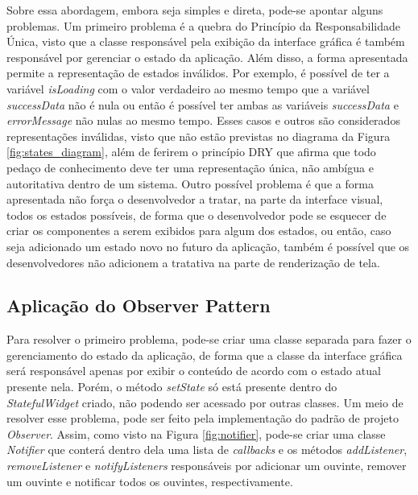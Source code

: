\documentclass[12pt, %
openright, 
oneside, %
a4paper,    %
brazil]{facom-ufu-abntex2}
\begin{document}
Sobre essa abordagem, embora seja simples e direta, pode-se apontar alguns problemas. Um primeiro problema é a quebra do Princípio da Responsabilidade Única, visto que a classe responsável pela exibição da interface gráfica é também responsável por gerenciar o estado da aplicação. Além disso, a forma apresentada permite a representação de estados inválidos. Por exemplo, é possível de ter a variável \textit{isLoading} com o valor verdadeiro ao mesmo tempo que a variável \textit{successData} não é nula ou então é possível ter ambas as variáveis \textit{successData} e \textit{errorMessage} não nulas ao mesmo tempo. Esses casos e outros são considerados representações inválidas, visto que não estão previstas no diagrama da Figura \ref{fig:states_diagram}, além de ferirem o princípio DRY que afirma que todo pedaço de conhecimento deve ter uma representação única, não ambígua e autoritativa dentro de um sistema. Outro possível problema é que a forma apresentada não força o desenvolvedor a tratar, na parte da interface visual, todos os estados possíveis, de forma que o desenvolvedor pode se esquecer de criar os componentes a serem exibidos para algum dos estados, ou então, caso seja adicionado um estado novo no futuro da aplicação, também é possível que os desenvolvedores não adicionem a tratativa na parte de renderização de tela.

\subsection{Aplicação do Observer Pattern}

Para resolver o primeiro problema, pode-se criar uma classe separada para fazer o gerenciamento do estado da aplicação, de forma que a classe da interface gráfica será responsável apenas por exibir o conteúdo de acordo com o estado atual presente nela. Porém, o método \textit{setState} só está presente dentro do \textit{StatefulWidget} criado, não podendo ser acessado por outras classes. Um meio de resolver esse problema, pode ser feito pela implementação do padrão de projeto \textit{Observer}. Assim, como visto na Figura \ref{fig:notifier}, pode-se criar uma classe \textit{Notifier} que conterá dentro dela uma lista de \textit{callbacks} e os métodos \textit{addListener}, \textit{removeListener} e \textit{notifyListeners} responsáveis por adicionar um ouvinte, remover um ouvinte e notificar todos os ouvintes, respectivamente.
\end{document}
